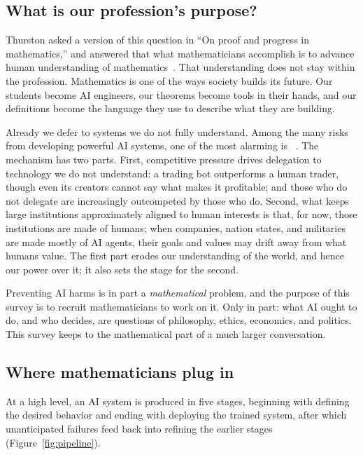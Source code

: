 \subsection{What is our profession's purpose?}

Thurston asked a version of this question in ``On proof and progress in mathematics,'' and answered that what mathematicians accomplish is to advance human understanding of mathematics~\cite{thurston1994}. That understanding does not stay within the profession. Mathematics is one of the ways society builds its future. Our students become AI engineers, our theorems become tools in their hands, and our definitions become the language they use to describe what they are building.

Already we defer to systems we do not fully understand. Among the many risks from developing powerful AI systems, one of the most alarming is ~\cite{kulveit2025}. The mechanism has two parts. First, competitive pressure drives delegation to technology we do not understand: a trading bot outperforms a human trader, though even its creators cannot say what makes it profitable; and those who do not delegate are increasingly outcompeted by those who do. Second, what keeps large institutions approximately aligned to human interests is that, for now, those institutions are made of humans; when companies, nation states, and militaries are made mostly of AI agents, their goals and values may drift away from what humans value. The first part erodes our understanding of the world, and hence our power over it; it also sets the stage for the second.

Preventing AI harms is in part a \emph{mathematical} problem, and the purpose of this survey is to recruit mathematicians to work on it. Only in part: what AI ought to do, and who decides, are questions of philosophy, ethics, economics, and politics. This survey keeps to the mathematical part of a much larger conversation.

\subsection{Where mathematicians plug in}
\label{sec:pipeline}

At a high level, an AI system is produced in five stages, beginning with defining the desired behavior and ending with deploying the trained system, after which unanticipated failures feed back into refining the earlier stages (Figure~\ref{fig:pipeline}).

